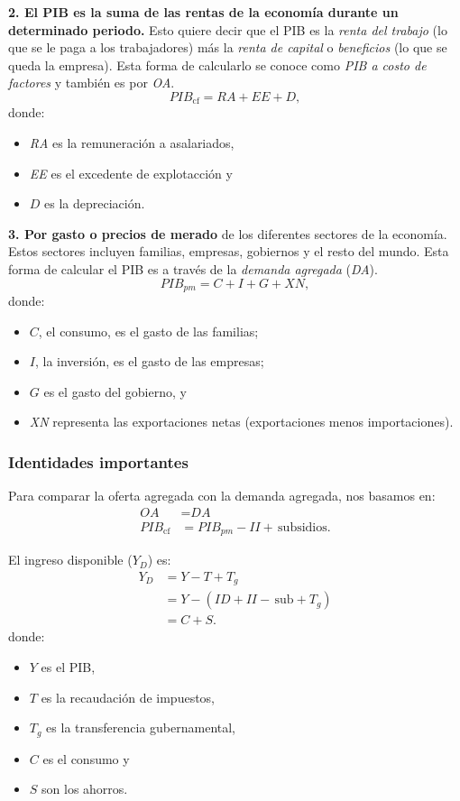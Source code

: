 \documentclass[10pt]{article}
\begin{document}
\begin{multicols*}{2}
\textbf{2. El PIB es la suma de las rentas de la economía durante un determinado periodo.} Esto quiere decir que el PIB es la \textit{renta del trabajo} (lo que se le paga a los trabajadores) más la \textit{renta de capital} o \textit{beneficios} (lo que se queda la empresa). Esta forma de calcularlo se conoce como \textit{PIB a costo de factores} y también es por \textit{OA}.
\[ \textit{PIB}_{\text{cf}} = \textit{RA} + \textit{EE} + D,\]
donde:
\begin{itemize}
    \item \textit{RA} es la remuneración a asalariados,
    \item \textit{EE} es el excedente de explotacción y
    \item $D$ es la depreciación.
\end{itemize}

\textbf{3. Por gasto o precios de merado} de los diferentes sectores de la economía. Estos sectores incluyen familias, empresas, gobiernos y el resto del mundo. Esta forma de calcular el PIB es a través de la \textit{demanda agregada} (\textit{DA}).
\[ \textit{PIB}_{\textit{pm}} = C + I + G + \textit{XN}, \]
donde:
\begin{itemize}
    \item $C$, el consumo, es el gasto de las familias;
    \item $I$, la inversión, es el gasto de las empresas;
    \item $G$ es el gasto del gobierno, y
    \item \textit{XN} representa las exportaciones netas (exportaciones menos importaciones).
\end{itemize}

\subsubsection{Identidades importantes}
Para comparar la oferta agregada con la demanda agregada, nos basamos en:
\begin{align*}
    \textit{OA} &= \textit{DA} \\
    \textit{PIB}_{\text{cf}} &= \textit{PIB}_{\textit{pm}} - \textit{II} + \,\textrm{subsidios}.
\end{align*}

El ingreso disponible ($Y_D$) es:
\begin{align*}
    Y_D &= Y - T + T_g \\
        &= Y - (\textit{ID} + \textit{II} - \,\textrm{sub} + T_g) \\
        &= C + S.
\end{align*}
donde:
\begin{itemize}
    \item $Y$ es el PIB,
    \item $T$ es la recaudación de impuestos,
    \item $T_g$ es la transferencia gubernamental,
    \item $C$ es el consumo y
    \item $S$ son los ahorros.
\end{itemize}


\end{multicols*}
\end{document}
